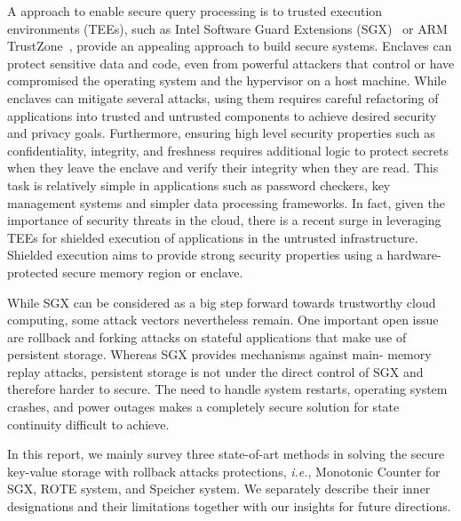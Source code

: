 A approach to enable secure query processing is to trusted execution environments (TEEs), such as Intel Software Guard Extensions (SGX)~\cite{sgxexplained} or ARM TrustZone~\cite{winter2008trusted}, provide an appealing approach to build secure systems. Enclaves can protect sensitive data and code, even from powerful attackers that control or have compromised the operating system and the hypervisor on a host machine. While enclaves can mitigate several attacks, using them requires careful refactoring of applications into trusted and untrusted components to achieve desired security and privacy goals. Furthermore, ensuring high level security properties such as confidentiality, integrity, and freshness requires additional logic to protect secrets when they leave the enclave and verify their integrity when they are read. This task is relatively simple in applications such as password checkers, key management systems and simpler data processing frameworks. In fact, given the importance of security threats in the cloud, there is a recent surge in leveraging TEEs for shielded execution of applications in the untrusted infrastructure. Shielded execution aims to provide strong security properties using a hardware-protected secure memory region or enclave.

While SGX can be considered as a big step forward towards trustworthy cloud computing, some attack vectors nevertheless remain. One important open issue are rollback and forking attacks on stateful applications that make use of persistent storage. Whereas SGX provides mechanisms against main- memory replay attacks, persistent storage is not under the direct control of SGX and therefore harder to secure. The need to handle system restarts, operating system crashes, and power outages makes a completely secure solution for state continuity difficult to achieve. 

In this report, we mainly survey three state-of-art methods in solving the secure key-value storage with rollback attacks protections, \textit{i.e.}, Monotonic Counter for SGX, ROTE system, and Speicher system. We separately describe their inner designations and their limitations together with our insights for future directions.
